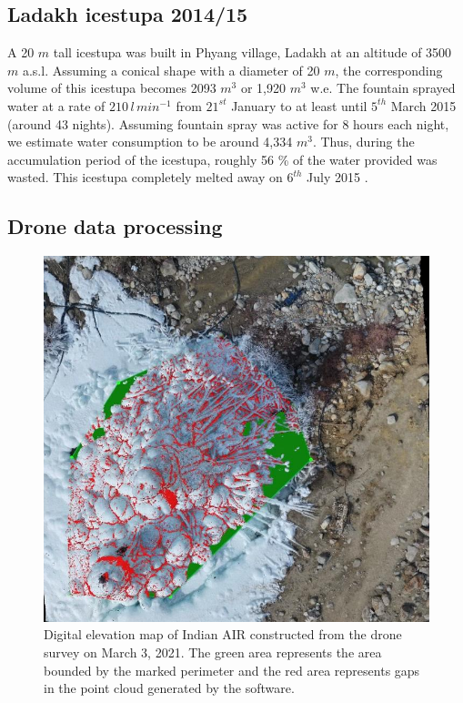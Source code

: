 \documentclass[utf8]{frontiersSCNS}
\begin{document}
\subsection{Ladakh icestupa 2014/15} \label{sec:ladakhloss}

A 20 $m$ tall icestupa \citep{iceheight} was built in Phyang village, Ladakh at an altitude of 3500 $m$ a.s.l.
Assuming a conical shape with a diameter of 20 $m$, the corresponding volume of this icestupa becomes 2093 $m^3$ or
1,920 $m^3$ w.e. The fountain sprayed water at a rate of $210\, l\,min^{-1}$ \citep{waterinput} from $21^{st}$
January \citep{waterstart} to at least until $5^{th}$ March 2015 \citep{waterend} (around 43 nights). Assuming
fountain spray was active for 8 hours each night, we estimate water consumption to be around 4,334 $m^3$. Thus,
during the accumulation period of the icestupa, roughly 56 \% of the water provided was wasted.  This icestupa
completely melted away on $6^{th}$ July 2015 \citep{iceends}.

\subsection{Drone data processing} \label{sec:uav}

\begin{figure}
	\begin{center}
		\includegraphics[width=10 cm]{Figures/gangles_DEM.jpg}
	\end{center}
	\caption{Digital elevation map of Indian AIR constructed from the drone survey on March 3, 2021. The green
		area represents the area bounded by the marked perimeter and the red area represents gaps in the point cloud
    generated by the software.
	}
	\label{fig:DEM}
\end{figure}
\end{document}

